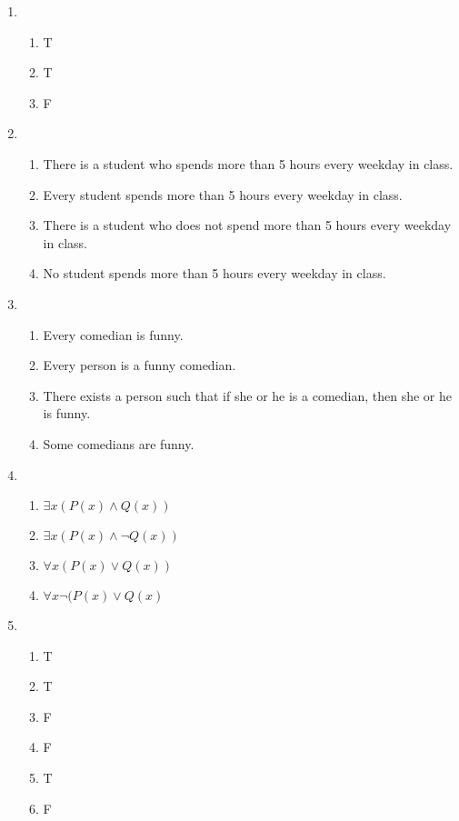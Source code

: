 \documentclass{../../cls/sig-alternate-05-2015}
\begin{document}
\begin{enumerate}
\item 
\begin{enumerate}
	\item T
	\item T
	\item F
\end{enumerate}

\item 
\begin{enumerate}
	\item There
	is a student who spends more than 5 hours every weekday
	in class.
	\item Every student spends more than 5 hours every
	weekday in class.
	\item There is a student who does not
	spend more than 5 hours every weekday in class.
	\item No
	student spends more than 5 hours every weekday in class.
\end{enumerate}

\item 
\begin{enumerate}
	\item Every comedian is funny.
	\item Every person is a funny
	comedian.
	\item There exists a person such that if she or he is
	a comedian, then she or he is funny.
	\item Some comedians
	are funny.
\end{enumerate}

\item 
\begin{enumerate}
	\item $\exists x (P(x) \wedge Q(x))$
	\item $\exists x (P(x) \wedge \neg Q(x))$
	\item $\forall x (P(x) \vee Q(x))$
	\item $\forall x \neg (P(x) \vee Q(x)$
\end{enumerate}

\item 
\begin{enumerate}
	\item T
	\item T
	\item F
	\item F
	\item T
	\item F
\end{enumerate}


\end{enumerate}
\end{document}
